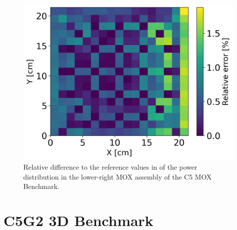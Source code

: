 \documentclass{anstrans}
\begin{document}
\begin{figure}[h] %
    \centering
    \includegraphics[width=0.75\linewidth]{figures/mox-r-pin-by-pin.png}
    \hfill
    \caption{Relative difference to the reference values in \cite{cavarec_benchmark_1994} of the power distribution in the lower-right MOX assembly of the C5 MOX Benchmark.}
    \label{fig:power-pbp}
\end{figure}






\section{C5G2 3D Benchmark}
\end{document}
